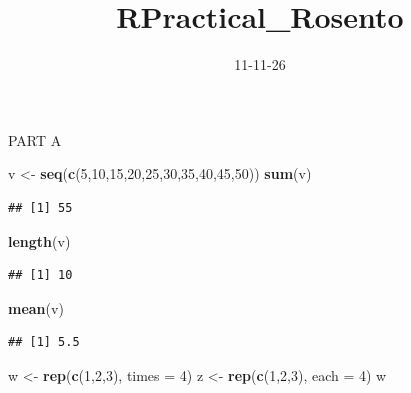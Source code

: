 \documentclass[
]{article}
\title{RPractical\_Rosento}
\author{}
\date{\vspace{-2.5em}11-11-26}
\newenvironment{Shaded}{\begin{snugshade}}{\end{snugshade}}
\newcommand{\AttributeTok}[1]{\textcolor[rgb]{0.13,0.29,0.53}{#1}}
\newcommand{\DecValTok}[1]{\textcolor[rgb]{0.00,0.00,0.81}{#1}}
\newcommand{\FunctionTok}[1]{\textcolor[rgb]{0.13,0.29,0.53}{\textbf{#1}}}
\newcommand{\NormalTok}[1]{#1}
\newcommand{\OtherTok}[1]{\textcolor[rgb]{0.56,0.35,0.01}{#1}}
\begin{document}
\maketitle

PART A

\begin{Shaded}
\begin{Highlighting}[]
\NormalTok{v }\OtherTok{\textless{}{-}} \FunctionTok{seq}\NormalTok{(}\FunctionTok{c}\NormalTok{(}\DecValTok{5}\NormalTok{,}\DecValTok{10}\NormalTok{,}\DecValTok{15}\NormalTok{,}\DecValTok{20}\NormalTok{,}\DecValTok{25}\NormalTok{,}\DecValTok{30}\NormalTok{,}\DecValTok{35}\NormalTok{,}\DecValTok{40}\NormalTok{,}\DecValTok{45}\NormalTok{,}\DecValTok{50}\NormalTok{))}
\FunctionTok{sum}\NormalTok{(v)}
\end{Highlighting}
\end{Shaded}

\begin{verbatim}
## [1] 55
\end{verbatim}

\begin{Shaded}
\begin{Highlighting}[]
\FunctionTok{length}\NormalTok{(v)}
\end{Highlighting}
\end{Shaded}

\begin{verbatim}
## [1] 10
\end{verbatim}

\begin{Shaded}
\begin{Highlighting}[]
\FunctionTok{mean}\NormalTok{(v)}
\end{Highlighting}
\end{Shaded}

\begin{verbatim}
## [1] 5.5
\end{verbatim}

\begin{Shaded}
\begin{Highlighting}[]
\NormalTok{w }\OtherTok{\textless{}{-}} \FunctionTok{rep}\NormalTok{(}\FunctionTok{c}\NormalTok{(}\DecValTok{1}\NormalTok{,}\DecValTok{2}\NormalTok{,}\DecValTok{3}\NormalTok{), }\AttributeTok{times =} \DecValTok{4}\NormalTok{)}
\NormalTok{z }\OtherTok{\textless{}{-}} \FunctionTok{rep}\NormalTok{(}\FunctionTok{c}\NormalTok{(}\DecValTok{1}\NormalTok{,}\DecValTok{2}\NormalTok{,}\DecValTok{3}\NormalTok{), }\AttributeTok{each =} \DecValTok{4}\NormalTok{)}
\NormalTok{w }
\end{Highlighting}
\end{Shaded}
\end{document}
